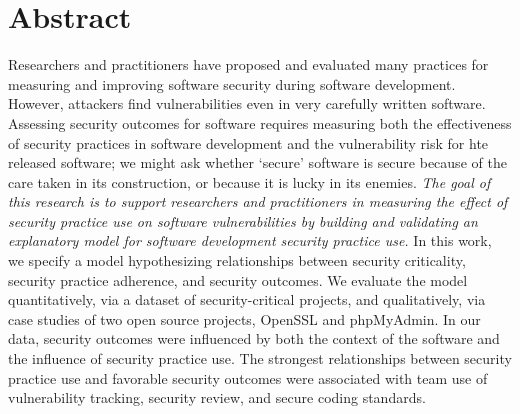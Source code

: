 \section{Abstract}
\label{sec:abstract}
Researchers and practitioners have proposed and evaluated many practices for measuring and improving software security during software development. However, attackers find vulnerabilities even in very carefully written software. Assessing security outcomes for software requires measuring both the effectiveness of security practices in software development and the vulnerability risk for hte released software; we might ask whether `secure' software is secure because of the care taken in its construction, or because it is lucky in its enemies. \textit{The goal of this research is to support researchers and practitioners in measuring the effect of security practice use on software vulnerabilities by building and validating an explanatory model for software development security practice use.} In this work, we specify a model hypothesizing relationships between security criticality, security practice adherence, and security outcomes.  We evaluate the model quantitatively, via a dataset of security-critical projects, and qualitatively, via case studies of two open source projects, OpenSSL and phpMyAdmin. In our data, security outcomes were influenced by both the context of the software and the influence of security practice use. The strongest relationships between security practice use and favorable security outcomes were associated with team use of vulnerability tracking, security review, and secure coding standards. 